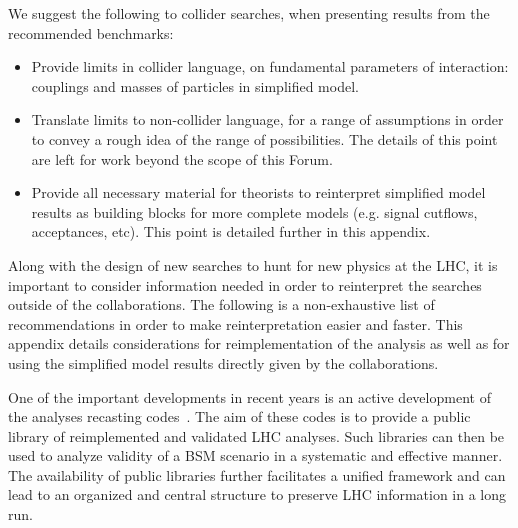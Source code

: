 
 We suggest the following to collider searches, when presenting results 
 from the recommended benchmarks: 
 \begin{itemize}
 \item Provide limits in collider language, on fundamental parameters of
 interaction: couplings and masses of particles in simplified model.
 \item Translate limits to non-collider language, for a range of
 assumptions in order to convey a rough idea of the range of
 possibilities. The details of this point are left for work beyond the scope of this Forum. 
 \item Provide all necessary material for theorists to reinterpret simplified
 model results as building blocks for more complete models (e.g. signal cutflows,
 acceptances, etc). This point is detailed further in this appendix.
 \end{itemize}

Along with the design of new searches to hunt for new physics at the LHC, it is important to consider information needed in order to reinterpret the searches outside of the collaborations. The following is a non-exhaustive list of recommendations in order to make reinterpretation easier and faster. This appendix details considerations for reimplementation of the analysis as well as for using the simplified model results directly given by the collaborations. 

One of the important developments in recent years is an active development of the analyses recasting codes~\cite{Dumont:2014tja, Conte:2014zja, Kim:2015wza}. The aim of these codes is to provide a public library of reimplemented and validated LHC analyses. Such libraries can then be used to analyze validity of a BSM scenario in a systematic and effective manner. The availability of public libraries further facilitates a unified framework and can lead to an organized and central structure to preserve LHC information in a long run. 

